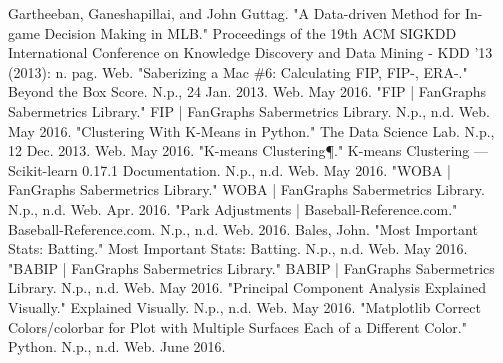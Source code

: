 \documentclass[12pt]{article}
\numberwithin{equation}{subsection}
\begin{document}
\pagebreak
\normalsize

\begin{thebibliography}{1}
	 Gartheeban, Ganeshapillai, and John Guttag. "A Data-driven Method for In-game Decision Making in MLB." Proceedings of the 19th ACM SIGKDD International Conference on Knowledge Discovery and Data Mining - KDD '13 (2013): n. pag. Web. %
    "Saberizing a Mac \#6: Calculating FIP, FIP-, ERA-." Beyond the Box Score. N.p., 24 Jan. 2013. Web. May 2016. %
    "FIP | FanGraphs Sabermetrics Library." FIP | FanGraphs Sabermetrics Library. N.p., n.d. Web. May 2016.  %
      "Clustering With K-Means in Python." The Data Science Lab. N.p., 12 Dec. 2013. Web. May 2016. %
     "K-means Clustering¶." K-means Clustering — Scikit-learn 0.17.1 Documentation. N.p., n.d. Web. May 2016. %
    "WOBA | FanGraphs Sabermetrics Library." WOBA | FanGraphs Sabermetrics Library. N.p., n.d. Web. Apr. 2016. %
    "Park Adjustments | Baseball-Reference.com." Baseball-Reference.com. N.p., n.d. Web. 2016.  %
     Bales, John. "Most Important Stats: Batting." Most Important Stats: Batting. N.p., n.d. Web. May 2016. %
     "BABIP | FanGraphs Sabermetrics Library." BABIP | FanGraphs Sabermetrics Library. N.p., n.d. Web. May 2016.  %
      "Principal Component Analysis Explained Visually." Explained Visually. N.p., n.d. Web. May 2016. %
     "Matplotlib Correct Colors/colorbar for Plot with Multiple Surfaces Each of a Different Color." Python. N.p., n.d. Web. June 2016. %

    
\end{thebibliography}
\end{document}
